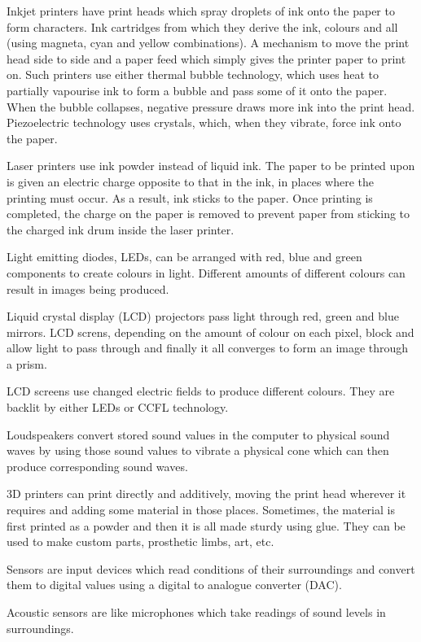 Inkjet printers have print heads which spray droplets of ink onto the paper to form characters.
Ink cartridges from which they derive the ink, colours and all (using magneta, cyan and yellow 
combinations). A mechanism to move the print head side to side and a paper feed which simply gives
the printer paper to print on. Such printers use either thermal bubble technology, which uses
heat to partially vapourise ink to form a bubble and pass some of it onto the paper. When the
bubble collapses, negative pressure draws more ink into the print head. Piezoelectric technology
uses crystals, which, when they vibrate, force ink onto the paper.

Laser printers use ink powder instead of liquid ink. The paper to be printed upon is given an 
electric charge opposite to that in the ink, in places where the printing must occur. As a result,
ink sticks to the paper. Once printing is completed, the charge on the paper is removed to prevent
paper from sticking to the charged ink drum inside the laser printer.

Light emitting diodes, LEDs, can be arranged with red, blue and green components to create colours
in light. Different amounts of different colours can result in images being produced.

Liquid crystal display (LCD) projectors pass light through red, green and blue mirrors. LCD screns,
depending on the amount of colour on each pixel, block and allow light to pass through and finally
it all converges to form an image through a prism.

LCD screens use changed electric fields to produce different colours. They are backlit by either
LEDs or CCFL technology.

Loudspeakers convert stored sound values in the computer to physical sound waves by using those
sound values to vibrate a physical cone which can then produce corresponding sound waves.

3D printers can print directly and additively, moving the print head wherever it requires and 
adding some material in those places. Sometimes, the material is first printed as a powder and then
it is all made sturdy using glue. They can be used to make custom parts, prosthetic limbs, art, etc.

Sensors are input devices which read conditions of their surroundings and convert them to digital
values using a digital to analogue converter (DAC).

Acoustic sensors are like microphones which take readings of sound levels in surroundings.

